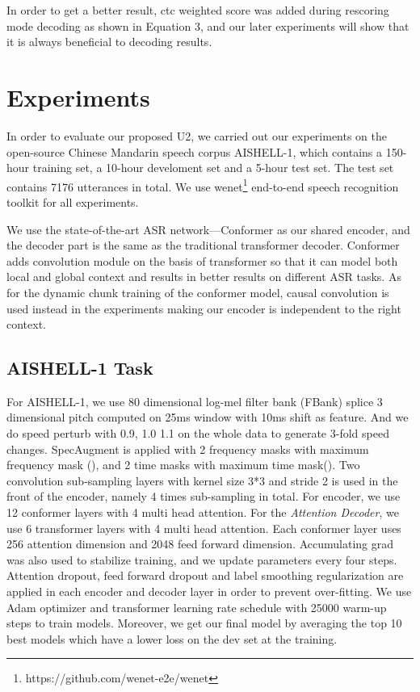 \documentclass[a4paper]{article}
\begin{document}
In order to get a better result, ctc weighted score was added during rescoring mode decoding as shown in Equation 3, and our later experiments will show that it is always beneficial to decoding results. 

\section{Experiments}

In order to evaluate our proposed U2, we carried out our experiments on the open-source Chinese Mandarin speech corpus AISHELL-1\cite{bu2017aishell}, which contains a 150-hour training set, a 10-hour develoment set and a 5-hour test set. The test set contains 7176 utterances in total.
We use wenet\footnote{https://github.com/wenet-e2e/wenet} end-to-end speech recognition toolkit for all experiments.

We use the state-of-the-art ASR network---Conformer \cite{gulati2020conformer} as our shared encoder, and the decoder part is the same as the traditional transformer decoder. Conformer adds convolution module on the basis of transformer so that it can model both local and global context and results in better results on different ASR tasks. As for the dynamic chunk training of the conformer model, causal convolution is used instead in the experiments making our encoder is independent to the right context. \\

\subsection{AISHELL-1 Task}
For AISHELL-1, we use 80 dimensional log-mel filter bank (FBank) splice 3 dimensional pitch computed on 25ms window with 10ms shift as feature. And we do speed perturb with 0.9, 1.0 1.1 on the whole data to generate 3-fold speed changes. 
SpecAugment\cite{park2019specaugment} is applied with 2 frequency masks with maximum frequency mask (), and 2 time masks with maximum time mask(). Two convolution sub-sampling layers with kernel size 3*3 and stride 2 is used in the front of the encoder, namely 4 times sub-sampling in total. For encoder, we use 12 conformer layers with 4 multi head attention. For the \textit{Attention Decoder}, we use 6 transformer layers with 4 multi head attention. Each conformer layer uses 256 attention dimension and 2048 feed forward dimension. Accumulating grad was also used to stabilize training, and we update parameters every four steps. Attention dropout, feed forward dropout and label smoothing regularization are applied in each encoder and decoder layer in order to prevent over-fitting. We use Adam optimizer and transformer learning rate schedule with 25000 warm-up steps to train models. Moreover, we get our final model by averaging the top 10 best models which have a lower loss on the dev set at the training.
\end{document}
